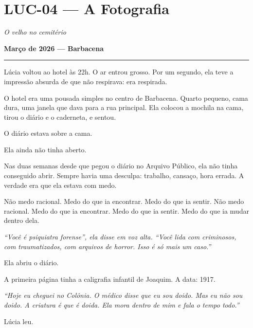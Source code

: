 \section*{\textbf{LUC-04} --- A Fotografia}

\noindent \textit{O velho no cemitério}

\noindent \textbf{Março de 2026 --- Barbacena}

\vspace{0.5em}\noindent\rule{\textwidth}{0.5pt}\vspace{0.5em}

\noindent Lúcia voltou ao hotel às 22h.
\noindent O ar entrou grosso. Por um segundo, ela teve a impressão absurda de que não respirava: era respirada.

\noindent O hotel era uma pousada simples no centro de Barbacena. Quarto pequeno, cama dura, uma janela que dava para a rua principal. Ela colocou a mochila na cama, tirou o diário e o caderneta, e sentou.

\noindent O diário estava sobre a cama.

\noindent Ela ainda não tinha aberto.

\noindent Nas duas semanas desde que pegou o diário no Arquivo Público, ela não tinha conseguido abrir. Sempre havia uma desculpa: trabalho, cansaço, hora errada. A verdade era que ela estava com medo.

\noindent Não medo racional.
Medo do que ia encontrar.
Medo do que ia sentir.
\noindent Não medo racional. Medo do que ia encontrar. Medo do que ia sentir. Medo do que ia mudar dentro dela.

\noindent \textit{\textquotedblleft{}Você é psiquiatra forense\textquotedblright{}\textit{, ela disse em voz alta. }\textquotedblleft{}Você lida com criminosos, com traumatizados, com arquivos de horror. Isso é só mais um caso.\textquotedblright{}}

\noindent Ela abriu o diário.

\noindent A primeira página tinha a caligrafia infantil de Joaquim. A data: 1917.

\noindent \textit{\textquotedblleft{}Hoje eu cheguei no Colônia. O médico disse que eu sou doido. Mas eu não sou doido. A criatura é que é doida. Ela mora dentro de mim e fala o tempo todo.\textquotedblright{}}

\noindent Lúcia leu.

